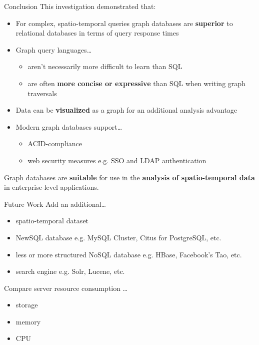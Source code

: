 \begin{frame}{Conclusion}
    This investigation demonstrated that:
    \vfill
    \begin{itemize}
        \item For complex, spatio-temporal queries graph databases are \textbf{superior} to relational databases in terms of query response times
        \item Graph query languages\dots
        \begin{itemize}
            \item aren't necessarily more difficult to learn than SQL
            \item are often \textbf{more concise or expressive} than SQL when writing graph traversals
        \end{itemize}
        \item Data can be \textbf{visualized} as a graph for an additional analysis advantage
        \item Modern graph databases support\dots
        \begin{itemize}
            \item ACID-compliance
            \item web security measures e.g. SSO and LDAP authentication
        \end{itemize}
    \end{itemize}
    \vfill
    Graph databases are \textbf{suitable} for use in the \textbf{analysis of spatio-temporal data} in  enterprise-level applications.
\end{frame}

\begin{frame}{Future Work}
    Add an additional\dots
    \begin{itemize}
        \item spatio-temporal dataset
        \item NewSQL database e.g. MySQL Cluster, Citus for PostgreSQL, etc.
        \item less or more structured NoSQL database e.g. HBase, Facebook's Tao, etc.
        \item search engine e.g. Solr, Lucene, etc.
    \end{itemize}
    \vfill
    Compare server resource consumption \dots
    \begin{itemize}
        \item storage
        \item memory
        \item CPU
    \end{itemize}
\end{frame}